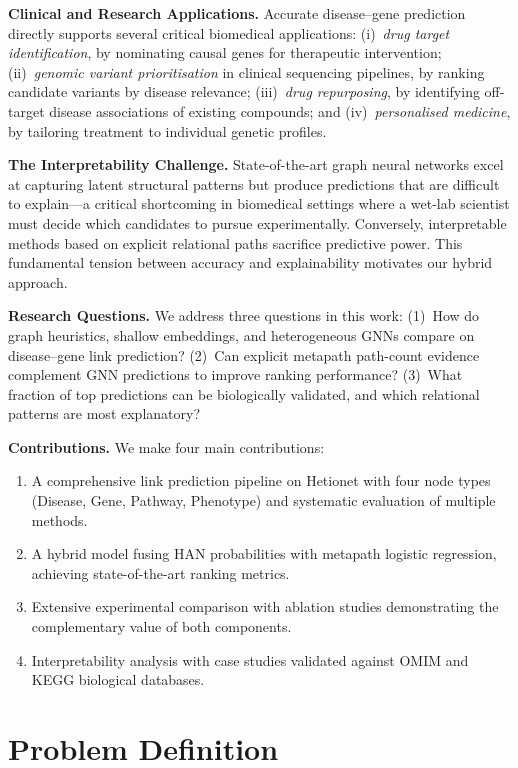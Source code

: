 \documentclass{article}
\begin{document}
\textbf{Clinical and Research Applications.} Accurate disease--gene prediction directly supports several critical biomedical applications: (i)~\textit{drug target identification}, by nominating causal genes for therapeutic intervention; (ii)~\textit{genomic variant prioritisation} in clinical sequencing pipelines, by ranking candidate variants by disease relevance; (iii)~\textit{drug repurposing}, by identifying off-target disease associations of existing compounds; and (iv)~\textit{personalised medicine}, by tailoring treatment to individual genetic profiles.

\textbf{The Interpretability Challenge.} State-of-the-art graph neural networks excel at capturing latent structural patterns but produce predictions that are difficult to explain---a critical shortcoming in biomedical settings where a wet-lab scientist must decide which candidates to pursue experimentally. Conversely, interpretable methods based on explicit relational paths sacrifice predictive power. This fundamental tension between accuracy and explainability motivates our hybrid approach.

\textbf{Research Questions.} We address three questions in this work: (1)~How do graph heuristics, shallow embeddings, and heterogeneous GNNs compare on disease--gene link prediction? (2)~Can explicit metapath path-count evidence complement GNN predictions to improve ranking performance? (3)~What fraction of top predictions can be biologically validated, and which relational patterns are most explanatory?

\textbf{Contributions.} We make four main contributions:
\begin{enumerate}
\item A comprehensive link prediction pipeline on Hetionet with four node types (Disease, Gene, Pathway, Phenotype) and systematic evaluation of multiple methods.
\item A hybrid model fusing HAN probabilities with metapath logistic regression, achieving state-of-the-art ranking metrics.
\item Extensive experimental comparison with ablation studies demonstrating the complementary value of both components.
\item Interpretability analysis with case studies validated against OMIM and KEGG biological databases.
\end{enumerate}

\section{Problem Definition}
\label{sec:problem}
\end{document}
